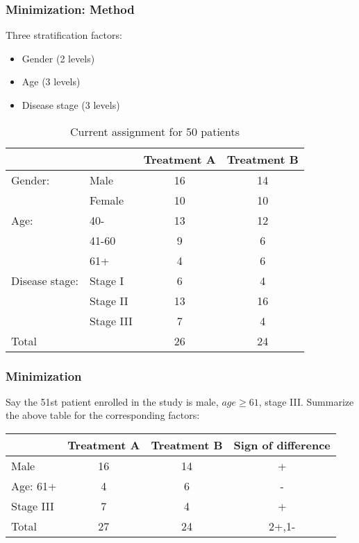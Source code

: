 \documentclass[table,10pt]{beamer}
\begin{document}
\begin{CJK*}{UTF8}{gbsn}
\begin{frame}[t]
\frametitle{Minimization: Method}
Three stratification factors:
\begin{itemize}
	\item Gender (2 levels)
	\item Age (3 levels)
	\item Disease stage (3 levels)
\end{itemize}
\begin{table}
\footnotesize
\caption{Current assignment for 50 patients}
\begin{tabular}{llcc}
\hline
& & Treatment A & Treatment B\\
\hline
Gender: & Male & 16 & 14\\
& Female & 10 & 10\\
\hline
Age: & 40- & 13 & 12\\
& 41-60 & 9 & 6\\
& 61+ & 4 & 6\\
\hline
Disease stage: & Stage I & 6 & 4\\
& Stage II & 13 & 16\\
& Stage III & 7 & 4\\
\hline
Total & & 26 & 24
\end{tabular}
\end{table}
\end{frame}

\begin{frame}[t]
\frametitle{Minimization}
Say the 51st patient enrolled in the study is male, $age \ge 61$, stage III.
Summarize the above table for the corresponding factors:
\begin{table}
\footnotesize
\begin{tabular}{lccc}
\hline
 & Treatment A & Treatment B & Sign of difference\\
\hline
Male & 16 & 14 & +\\
Age: 61+ & 4 & 6 & -\\
Stage III & 7 & 4 & +\\
\hline
Total & 27 & 24 & 2+,1-
\end{tabular}
\end{table}
\end{frame}


\end{CJK*}
\end{document}
